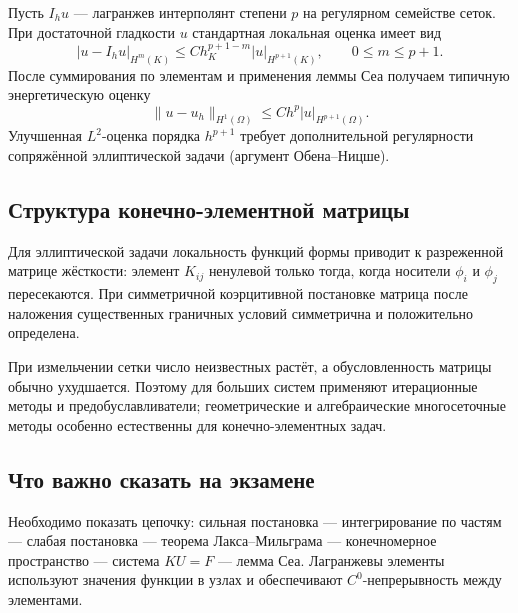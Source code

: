 Пусть $I_hu$ --- лагранжев интерполянт степени $p$ на регулярном семействе сеток.
При достаточной гладкости $u$ стандартная локальная оценка имеет вид
\[
    |u-I_hu|_{H^m(K)}
    \le C h_K^{p+1-m}|u|_{H^{p+1}(K)},
    \qquad 0\le m\le p+1.
\]
После суммирования по элементам и применения леммы Сеа получаем типичную энергетическую
оценку
\[
    \|u-u_h\|_{H^1(\Omega)}
    \le Ch^p|u|_{H^{p+1}(\Omega)}.
\]
Улучшенная $L^2$-оценка порядка $h^{p+1}$ требует дополнительной регулярности
сопряжённой эллиптической задачи (аргумент Обена--Ницше).

\subsection{Структура конечно-элементной матрицы}

Для эллиптической задачи локальность функций формы приводит к разреженной матрице
жёсткости: элемент $K_{ij}$ ненулевой только тогда, когда носители $\phi_i$ и $\phi_j$
пересекаются. При симметричной коэрцитивной постановке матрица после наложения
существенных граничных условий симметрична и положительно определена.

При измельчении сетки число неизвестных растёт, а обусловленность матрицы обычно
ухудшается. Поэтому для больших систем применяют итерационные методы и
предобуславливатели; геометрические и алгебраические многосеточные методы особенно
естественны для конечно-элементных задач.

\subsection{Что важно сказать на экзамене}

Необходимо показать цепочку: сильная постановка --- интегрирование по частям ---
слабая постановка --- теорема Лакса--Мильграма --- конечномерное пространство ---
система $KU=F$ --- лемма Сеа.
Лагранжевы элементы используют значения функции в узлах и обеспечивают
$C^0$-непрерывность между элементами.

\newpage